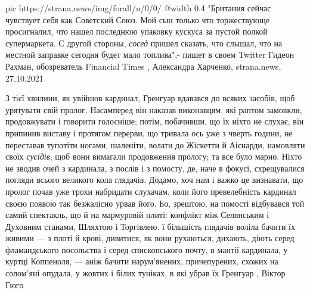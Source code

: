 \ifcmt
  pic https://strana.news/img/forall/u/0/0/%
  @width 0.4
\fi
"Британия сейчас чувствует себя как Советский Союз. Мой сын только что
торжествующе просигналил, что нашел последнюю упаковку кускуса за пустой полкой
супермаркета. С другой стороны, \emph{сосед} пришел сказать, что слышал, что на
местной заправке сегодня будет мало топлива",- пишет в своем Twitter Гидеон
Рахман, обозреватель Financial Times
, 
Александра Харченко, strana.news, 27.10.2021

З тієї хвилини, як увійшов кардинал, Гренгуар вдавався до всяких засобів, щоб
урятувати свій пролог. Насамперед він наказав виконавцям, які раптом замовкли,
продовжувати і говорити голосніше; потім, побачивши, що їх ніхто не слухає, він
припинив виставу і протягом перерви, що тривала ось уже з чверть години, не
переставав тупотіти ногами, шаленіти, волати до Жіскетти й Аієнарди, намовляти
своїх \emph{сусідів}, щоб вони вимагали продовження прологу; та все було марно. Ніхто
не зводив очей з кардинала, з послів і з помосту, де, наче в фокусі,
схрещувалися погляди всього великого кола глядачів. Додамо, хоч нам і важко це
визнавати, що пролог почав уже трохи набридати слухачам, коли його
превелебність кардинал своєю появою так безжалісно урвав його. Бо, зрештою, на
помості відбувався той самий спектакль, що й на мармуровій плиті: конфлікт між
Селянським і Духовним станами, Шляхтою і Торгівлею. ї більшість глядачів воліла
бачити їх живими — з плоті й крові, дивитися, як вони рухаються, дихають, діють
серед фламандського посольства і серед єпископського почту, в мантії кардинала,
у куртці Коппеноля, — аніж бачити нарум'янених, причепурених, схожих на
солом'яні опудала, у жовтих і білих туніках, в які убрав їх Гренгуар
, Віктор Гюго
